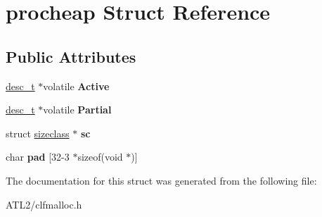 \hypertarget{structprocheap}{\section{procheap Struct Reference}
\label{structprocheap}
}
\subsection*{Public Attributes}
\begin{DoxyCompactItemize}
\item 
\hypertarget{structprocheap_a16dafd9789a76a53b1a7696df8947081}{\hyperlink{structdesc}{desc\+\_\+t} $\ast$volatile {\bfseries Active}}\label{structprocheap_a16dafd9789a76a53b1a7696df8947081}

\item 
\hypertarget{structprocheap_a11dffb3df6d76b5d0446fcb1ce26ba9b}{\hyperlink{structdesc}{desc\+\_\+t} $\ast$volatile {\bfseries Partial}}\label{structprocheap_a11dffb3df6d76b5d0446fcb1ce26ba9b}

\item 
\hypertarget{structprocheap_a28e29b2c5769fbd68050f6082902a3d3}{struct \hyperlink{structsizeclass}{sizeclass} $\ast$ {\bfseries sc}}\label{structprocheap_a28e29b2c5769fbd68050f6082902a3d3}

\item 
\hypertarget{structprocheap_ad520cbc7a4ccc75eb1f09da379c43e76}{char {\bfseries pad} \mbox{[}32-\/3 $\ast$sizeof(void $\ast$)\mbox{]}}\label{structprocheap_ad520cbc7a4ccc75eb1f09da379c43e76}

\end{DoxyCompactItemize}


The documentation for this struct was generated from the following file\+:\begin{DoxyCompactItemize}
\item 
A\+T\+L2/clfmalloc.\+h\end{DoxyCompactItemize}
